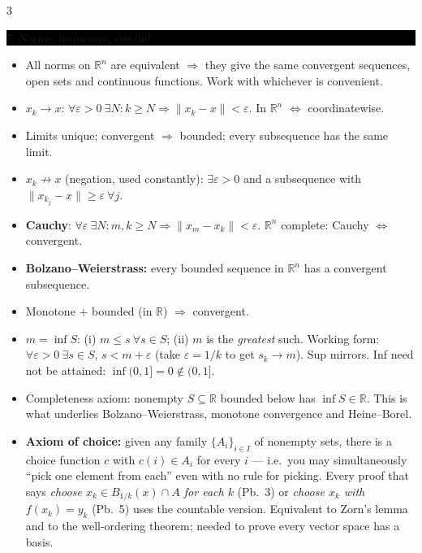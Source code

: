 \documentclass[8pt,letterpaper]{article}
\makeatletter
\newcommand{\sect}[1]{%
  \vspace{2.2pt}%
  \noindent\colorbox{black}{\parbox{\dimexpr\linewidth-2\fboxsep}{%
    \color{white}\bfseries\scshape\fontsize{6.4}{7.4}\selectfont
    \hyphenpenalty=10000\exhyphenpenalty=10000\raggedright #1}}%
  \vspace{1.4pt}\par\nopagebreak\@afterheading}
\newenvironment{tl}
  {\begin{itemize}[leftmargin=6pt,itemsep=0.3pt,topsep=1pt,parsep=0pt,
                   partopsep=0pt,label=\textcolor{gray}{\tiny$\bullet$}]}
  {\end{itemize}}
\newcommand{\R}{\mathbb{R}}
\newcommand{\Rn}{\mathbb{R}^n}
\newcommand{\nm}[1]{\lVert #1\rVert}
\makeatother
\begin{document}
\begin{multicols}{3}
\sect{7. Norms, Sequences, sup/inf}
\begin{tl}
\item All norms on $\Rn$ are equivalent $\Rightarrow$ they give the same convergent sequences, open sets and continuous functions. Work with whichever is convenient.
\item \textbf{$x_k\to x$}: $\forall\varepsilon>0\ \exists N: k\ge N\Rightarrow\nm{x_k-x}<\varepsilon$. In $\Rn$ $\iff$ coordinatewise.
\item Limits unique; convergent $\Rightarrow$ bounded; every subsequence has the same limit.
\item \textbf{$x_k\not\to x$} (negation, used constantly): $\exists\varepsilon>0$ and a subsequence with $\nm{x_{k_j}-x}\ge\varepsilon\ \forall j$.
\item \textbf{Cauchy}: $\forall\varepsilon\ \exists N: m,k\ge N\Rightarrow\nm{x_m-x_k}<\varepsilon$. $\Rn$ complete: Cauchy $\iff$ convergent.
\item \textbf{Bolzano--Weierstrass:} every bounded sequence in $\Rn$ has a convergent subsequence.
\item Monotone $+$ bounded (in $\R$) $\Rightarrow$ convergent.
\item \textbf{$m=\inf S$}: (i) $m\le s\ \forall s\in S$; (ii) $m$ is the \emph{greatest} such. Working form: $\forall\varepsilon>0\ \exists s\in S$, $s<m+\varepsilon$ (take $\varepsilon=1/k$ to get $s_k\to m$). Sup mirrors. Inf need not be attained: $\inf(0,1]=0\notin(0,1]$.
\item Completeness axiom: nonempty $S\subseteq\R$ bounded below has $\inf S\in\R$. This is what underlies Bolzano--Weierstrass, monotone convergence and Heine--Borel.
\item \textbf{Axiom of choice:} given any family $\{A_i\}_{i\in I}$ of nonempty sets, there is a choice function $c$ with $c(i)\in A_i$ for every $i$ --- i.e.\ you may simultaneously ``pick one element from each'' even with no rule for picking. Every proof that says \emph{choose $x_k\in B_{1/k}(x)\cap A$ for each $k$} (Pb.\ 3) or \emph{choose $x_k$ with $f(x_k)=y_k$} (Pb.\ 5) uses the countable version. Equivalent to Zorn's lemma and to the well-ordering theorem; needed to prove every vector space has a basis.
\end{tl}


\end{multicols}
\end{document}
